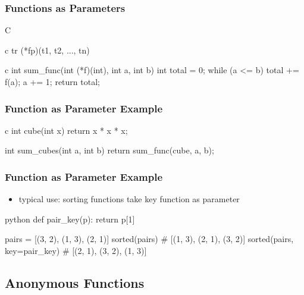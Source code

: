 \documentclass[dvipsnames]{beamer}
\theoremstyle{plain}
\begin{document}
\begin{frame}[fragile]
  \frametitle{Functions as Parameters}

  \begin{block}{C}
    \begin{pygments}{c}
      tr (*fp)(t1, t2, ..., tn)
    \end{pygments}
  \end{block}

  \pause
  \begin{example}[C]
    \begin{pygments}{c}
int sum_func(int (*f)(int), int a, int b)
{
    int total = 0;
    while (a <= b)
    {
        total += f(a);
        a += 1;
    }
    return total;
}
    \end{pygments}
  \end{example}
\end{frame}

\begin{frame}[fragile]
  \frametitle{Function as Parameter Example}

  \begin{example}[C]
    \begin{pygments}{c}
int cube(int x)
{
    return x * x * x;
}

int sum_cubes(int a, int b)
{
    return sum_func(cube, a, b);
}
    \end{pygments}
  \end{example}
\end{frame}

\begin{frame}[fragile]
  \frametitle{Function as Parameter Example}

  \begin{itemize}
    \item typical use: sorting functions take key function as parameter
  \end{itemize}

  \begin{example}[Python]
    \begin{pygments}{python}
def pair_key(p):
    return p[1]

pairs = [(3, 2), (1, 3), (2, 1)]
sorted(pairs)                   # [(1, 3), (2, 1), (3, 2)]
sorted(pairs, key=pair_key)     # [(2, 1), (3, 2), (1, 3)]
    \end{pygments}
  \end{example}
\end{frame}

\subsection{Anonymous Functions}
\end{document}

